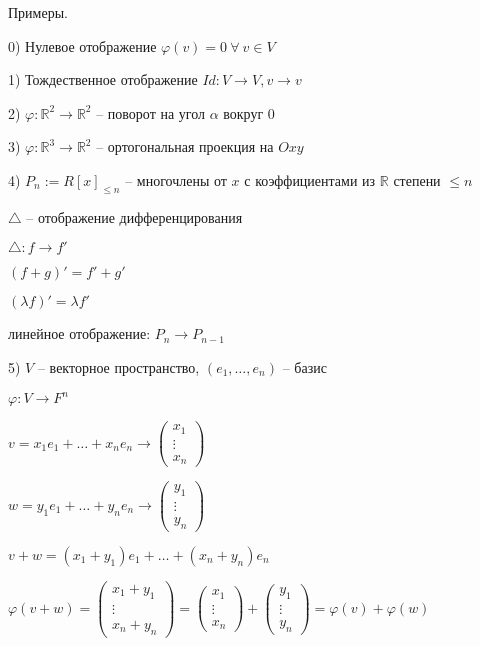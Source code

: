 \vspace{\baselineskip}
Примеры.

0) Нулевое отображение $\varphi (v) = 0 \ \forall \ v \in V$

1) Тождественное отображение $Id: V \rightarrow V, v \rightarrow v$

2) $\varphi: \mathbb{R}^2 \rightarrow \mathbb{R}^2$ -- поворот на угол $\alpha$ вокруг 0

3) $\varphi: \mathbb{R}^3 \rightarrow \mathbb{R}^2$ -- ортогональная проекция на $Oxy$

4) $P_n := R[x]_{\leq n}$ -- многочлены от $x$ с коэффициентами из $\mathbb{R}$ степени $\leq n$

$\triangle$ -- отображение дифференцирования

$\triangle: f \rightarrow f'$

$(f + g)' = f' + g'$

$(\lambda f)' = \lambda f'$

линейное отображение: $P_n \rightarrow P_{n-1}$

5) $V$ -- векторное пространство, $(e_1, \dots, e_n)$ -- базис

$\varphi: V \rightarrow F^n$

$v = x_1 e_1 + \dots + x_n e_n \rightarrow \begin{pmatrix} x_1 \\ \vdots \\ x_n \end{pmatrix}$

$w = y_1 e_1 + \dots + y_n e_n \rightarrow \begin{pmatrix} y_1 \\ \vdots \\ y_n \end{pmatrix}$

$v + w = (x_1 + y_1) e_1 + \dots + (x_n + y_n) e_n$

$\varphi(v + w) = \begin{pmatrix} x_1 + y_1 \\ \vdots \\ x_n + y_n \end{pmatrix} = \begin{pmatrix} x_1 \\ \vdots \\ x_n \end{pmatrix} + \begin{pmatrix} y_1 \\ \vdots \\ y_n \end{pmatrix} = \varphi(v) + \varphi(w)$

